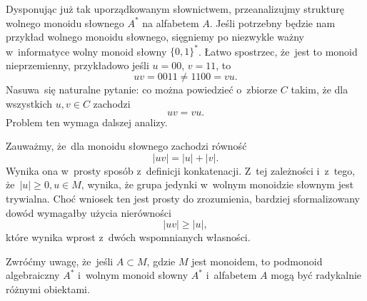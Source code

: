 \documentclass[a4paper,11pt]{article}
\begin{document}
\vspace{\spaceFour}





\start {} Dysponując już tak uporządkowanym słownictwem,
przeanalizujmy strukturę wolnego monoidu słownego $A^{ * }$ na
alfabetem $A$. Jeśli potrzebny będzie nam przykład wolnego monoidu
słownego, sięgniemy po niezwykle ważny w~informatyce wolny monoid
słowny $\{ 0, 1 \}^{ * }$. Łatwo spostrzec, że~jest to monoid
nieprzemienny, przykładowo jeśli $u = 00$, $v = 11$, to
\begin{equation}
  \label{eq:Forys-Forys-08}
  u v = 0011 \neq 1100 = vu.
\end{equation}
Nasuwa~się naturalne pytanie: co można powiedzieć o~zbiorze $C$ takim,
że dla wszystkich $u, v \in C$ zachodzi
\begin{equation}
  \label{eq:Forys-Forys-09}
  uv = vu.
\end{equation}
Problem ten wymaga dalszej analizy.

Zauważmy, że~dla monoidu słownego zachodzi równość
\begin{equation}
  \label{eq:Forys-Forys-10}
  | u v | = | u | + | v |.
\end{equation}
Wynika ona w~prosty sposób z~definicji konkatenacji. Z~tej zależności
i~z~tego, że~$| u | \geq 0, u \in M$, wynika, że grupa jedynki
w~wolnym monoidzie słownym jest trywialna. Choć wniosek ten jest
prosty do zrozumienia, bardziej sformalizowany dowód wymagałby użycia
nierówności
\begin{equation}
  \label{eq:Forys-Forys-11}
  | u v | \geq | u |,
\end{equation}
które wynika wprost z~dwóch wspomnianych własności.

\vspace{\spaceFour}





 Zwróćmy uwagę, że~jeśli $A \subset M$, gdzie $M$ jest
monoidem, to podmonoid algebraiczny $A^{ * }$ i~wolnym monoid słowny
$A^{ * }$ i~alfabetem $A$ mogą być radykalnie różnymi obiektami.
\end{document}

